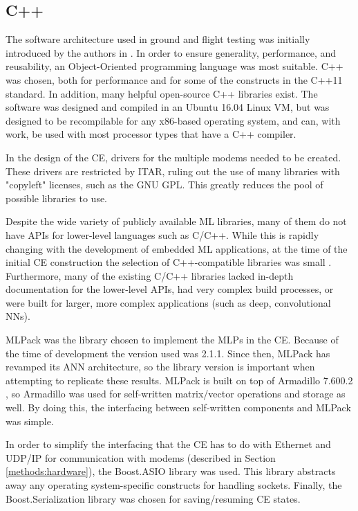 \subsection{C++}
\par The software architecture used in ground and flight testing was initially introduced by the authors in \cite{tim_implementation_paper}. In order to ensure generality, performance, and reusability, an Object-Oriented programming language was most suitable. C++ was chosen, both for performance and for some of the constructs in the C++11 standard. In addition, many helpful open-source C++ libraries exist. The software was designed and compiled in an Ubuntu 16.04 Linux VM, but was designed to be recompilable for any x86-based operating system, and can, with work, be used with most processor types that have a C++ compiler.
\par In the design of the CE, drivers for the multiple modems needed to be created. These drivers are restricted by ITAR, ruling out the use of many libraries with "copyleft" licenses, such as the GNU GPL. This greatly reduces the pool of possible libraries to use. 
\par Despite the wide variety of publicly available ML libraries, many of them do not have APIs for lower-level languages such as C/C++. While this is rapidly changing with the development of embedded ML applications, at the time of the initial CE construction the selection of C++-compatible libraries was small \cite{tim_implementation_paper}. Furthermore, many of the existing C/C++ libraries lacked in-depth documentation for the lower-level APIs, had very complex build processes, or were built for larger, more complex applications (such as deep, convolutional NNs). 
\par MLPack \cite{mlpack_lib} was the library chosen to implement the MLPs in the CE. Because of the time of development the version used was 2.1.1. Since then, MLPack has revamped its ANN architecture, so the library version is important when attempting to replicate these results. MLPack is built on top of Armadillo 7.600.2 \cite{armadillo_lib}, so Armadillo was used for self-written matrix/vector operations and storage as well. By doing this, the interfacing between self-written components and MLPack was simple. 
\par In order to simplify the interfacing that the CE has to do with Ethernet and UDP/IP for communication with modems (described in Section \ref{methods:hardware}), the Boost.ASIO \cite{boost_libs} library was used. This library abstracts away any operating system-specific constructs for handling sockets. Finally, the Boost.Serialization \cite{boost_libs} library was chosen for saving/resuming CE states. 
